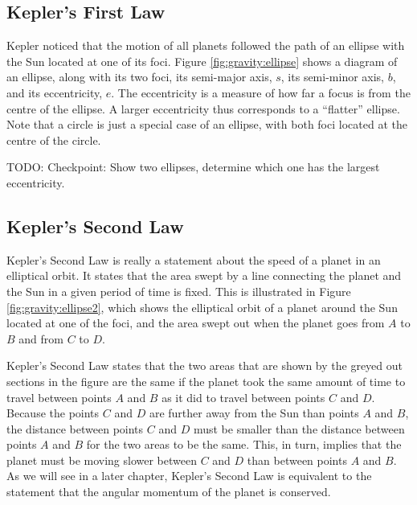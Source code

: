 \subsection{Kepler's First Law}
Kepler noticed that the motion of all planets followed the path of an ellipse with the Sun located at one of its foci. Figure \ref{fig:gravity:ellipse} shows a diagram of an ellipse, along with its two foci, its semi-major axis, $s$, its semi-minor axis, $b$, and its eccentricity, $e$. The eccentricity is a measure of how far a focus is from the centre of the ellipse. A larger eccentricity thus corresponds to a ``flatter'' ellipse. Note that a circle is just a special case of an ellipse, with both foci located at the centre of the circle.


TODO: Checkpoint: Show two ellipses, determine which one has the largest eccentricity.

\subsection{Kepler's Second Law}
Kepler's Second Law is really a statement about the speed of a planet in an elliptical orbit. It states that the area swept by a line connecting the planet and the Sun in a given period of time is fixed. This is illustrated in Figure \ref{fig:gravity:ellipse2}, which shows the elliptical orbit of a planet around the Sun located at one of the foci, and the area swept out when the planet goes from $A$ to $B$ and from $C$ to $D$. 

Kepler's Second Law states that the two areas that are shown by the greyed out sections in the figure are the same if the planet took the same amount of time to travel between points $A$ and $B$ as it did to travel between points $C$ and $D$. Because the points $C$ and $D$ are further away from the Sun than points $A$ and $B$, the distance between points $C$ and $D$ must be smaller than the distance between points $A$ and $B$ for the two areas to be the same. This, in turn, implies that the planet must be moving slower between $C$ and $D$ than between points $A$ and $B$. As we will see in a later chapter, Kepler's Second Law is equivalent to the statement that the angular momentum of the planet is conserved. 


